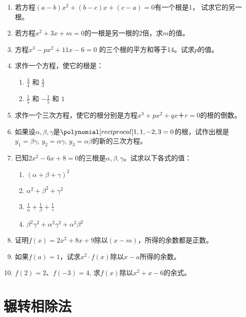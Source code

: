 \begin{enumerate}
\item 若方程$(a-b)x^2+(b-c)x+(c-a)=0$有一个根是1，
试求它的另一根。
\item 若方程$x^2+3x+m=0$的一根是另一根的2倍，求$m$的值。
\item 方程$x^3-px^2+11x-6=0$ 的三个根的平方和等于14。试求$p$的值。
\item 求作一个方程，使它的根是：
\begin{multicols}{2}
    \begin{enumerate}
    \item $\frac{3}{4}$ 和 $\frac{4}{3}$
    \item $\frac{1}{5}$ 和 $-\frac{1}{5}$ 和 $1$
\end{enumerate}
\end{multicols}

\item 求作一个三次方程，使它的根分别是方程$x^3+px^2+qx＋r=0$的根的倒数。

\item 如果设$\alpha,\beta,
\gamma$是$\poly{1,1,-2,3}=0$的根，试作出根是
$y_1=\beta\gamma$, $y_2=\alpha\gamma$, $y_3=\alpha\beta$的新的三次方程。

\item 已知$2x^2-6x+8=0$的三根是$\alpha,\beta,
\gamma$。试求以下各式的值：
\begin{multicols}{2}
    \begin{enumerate}
    \item $(\alpha+\beta+\gamma)^2$ 
    \item $\alpha^2+\beta^2+\gamma^2$ 
    \item $\frac{1}{\alpha}+\frac{1}{\beta}+\frac{1}{\gamma}$
    \item $\beta^2\gamma^2+\alpha^2\gamma^2+\alpha^2\beta^2$
\end{enumerate}
\end{multicols}

\item 证明$f(x)=2x^2+8x+9$除以$(x-m)$，所得的余数都是正数。

\item 如果$f(a)=1$，试求$x^2\cdot f(x)$除以$x-a$所得的余数。

\item $f(2)=2$、$f(-3)=4$, 求$f(x)$除以$x^2+x-6$的余式。

\end{enumerate}


\section{辗转相除法}
